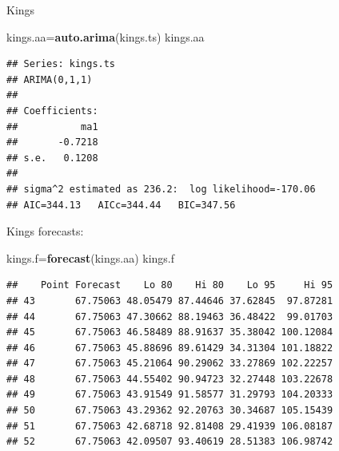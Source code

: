 \documentclass[ignorenonframetext,]{beamer}
\newenvironment{Shaded}{\begin{snugshade}}{\end{snugshade}}
\newcommand{\KeywordTok}[1]{\textcolor[rgb]{0.13,0.29,0.53}{\textbf{#1}}}
\newcommand{\NormalTok}[1]{#1}
\begin{document}
\begin{frame}[fragile]{Kings}
\protect\hypertarget{kings}{}

\begin{Shaded}
\begin{Highlighting}[]
\NormalTok{kings.aa=}\KeywordTok{auto.arima}\NormalTok{(kings.ts)}
\NormalTok{kings.aa}
\end{Highlighting}
\end{Shaded}

\begin{verbatim}
## Series: kings.ts 
## ARIMA(0,1,1) 
## 
## Coefficients:
##           ma1
##       -0.7218
## s.e.   0.1208
## 
## sigma^2 estimated as 236.2:  log likelihood=-170.06
## AIC=344.13   AICc=344.44   BIC=347.56
\end{verbatim}

\end{frame}

\begin{frame}[fragile]{Kings forecasts:}
\protect\hypertarget{kings-forecasts}{}

\small

\begin{Shaded}
\begin{Highlighting}[]
\NormalTok{kings.f=}\KeywordTok{forecast}\NormalTok{(kings.aa)}
\NormalTok{kings.f}
\end{Highlighting}
\end{Shaded}

\begin{verbatim}
##    Point Forecast    Lo 80    Hi 80    Lo 95     Hi 95
## 43       67.75063 48.05479 87.44646 37.62845  97.87281
## 44       67.75063 47.30662 88.19463 36.48422  99.01703
## 45       67.75063 46.58489 88.91637 35.38042 100.12084
## 46       67.75063 45.88696 89.61429 34.31304 101.18822
## 47       67.75063 45.21064 90.29062 33.27869 102.22257
## 48       67.75063 44.55402 90.94723 32.27448 103.22678
## 49       67.75063 43.91549 91.58577 31.29793 104.20333
## 50       67.75063 43.29362 92.20763 30.34687 105.15439
## 51       67.75063 42.68718 92.81408 29.41939 106.08187
## 52       67.75063 42.09507 93.40619 28.51383 106.98742
\end{verbatim}

\normalsize

\end{frame}
\end{document}

